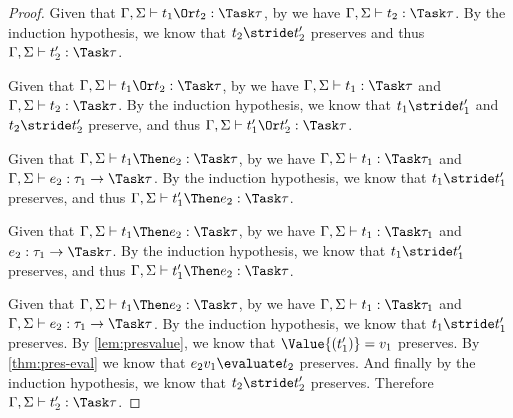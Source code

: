 \begin{proof}
     {Given that $\Gamma,\Sigma\infers t_1\Or t_2:\Task\tau$, by  we have $\Gamma,\Sigma\infers t_2:\Task\tau$.
     By the induction hypothesis, we know that $t_2\stride t_2'$ preserves and thus $\Gamma,\Sigma\infers t_2':\Task\tau$.}

  {Given that $\Gamma,\Sigma\infers t_1\Or t_2:\Task\tau$, by  we have $\Gamma,\Sigma\infers t_1:\Task\tau$ and $\Gamma,\Sigma\infers t_2:\Task\tau$.
  By the induction hypothesis, we know that $t_1\stride t_1'$ and $t_2\stride t_2'$ preserve, and thus $\Gamma,\Sigma\infers t_1'\Or t_2':\Task\tau$.}

  {Given that $\Gamma,\Sigma\infers t_1\Then e_2:\Task\tau$, by  we have $\Gamma,\Sigma\infers t_1:\Task\tau_1$ and $\Gamma,\Sigma\infers e_2:\tau_1\to\Task\tau$.
  By the induction hypothesis, we know that $t_1\stride t_1'$ preserves, and thus $\Gamma,\Sigma\infers t_1'\Then e_2:\Task\tau$.}

  {Given that $\Gamma,\Sigma\infers t_1\Then e_2:\Task\tau$,
  by  we have $\Gamma,\Sigma\infers t_1:\Task\tau_1$ and
  $e_2:\tau_1\to\Task\tau$. By the induction
  hypothesis, we know that $t_1\stride t_1'$ preserves, and thus
  $\Gamma,\Sigma\infers t_1'\Then e_2:\Task\tau$.}

  {Given that $\Gamma,\Sigma\infers t_1\Then e_2:\Task\tau$, by  we have
  $\Gamma,\Sigma\infers t_1:\Task\tau_1$ and
  $\Gamma,\Sigma\infers e_2:\tau_1\to\Task\tau$. By the induction hypothesis, we
  know that $t_1\stride t_1'$ preserves. By \cref{lem:presvalue}, we know
  that $\Value{(t_1')}=v_1$ preserves. By \cref{thm:pres-eval} we know
  that $e_2 v_1\evaluate t_2$ preserves. And finally by the induction hypothesis,
  we know that $t_2\stride t_2'$ preserves. Therefore
  $\Gamma,\Sigma\infers t_2':\Task\tau$.}

\end{proof}



\subsection{}

